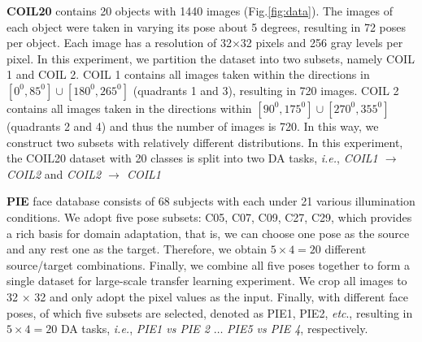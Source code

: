 \documentclass[journal,twocolumn]{IEEEtran}
\begin{document}
\begin{CJK*}{UTF8}{gkai}
\textbf{COIL20} contains 20 objects with 1440 images (Fig.\ref{fig:data}). The images of each object were taken in varying its pose about 5 degrees, resulting in 72 poses per object. Each image has a resolution of 32×32 pixels and 256 gray levels per pixel. In this experiment, we partition the dataset into two subsets, namely COIL 1 and COIL 2\cite{DBLP:journals/tip/XuFWLZ16}. COIL 1 contains all images taken within the directions in $[{0^0},{85^0}] \cup [{180^0},{265^0}]$ (quadrants 1 and 3), resulting in 720 images. COIL 2 contains all images taken in the directions
within $[{90^0},{175^0}] \cup [{270^0},{355^0}]$ (quadrants 2 and 4) and thus the number of images is 720. In this way, we construct two subsets with relatively different distributions. In this experiment, the COIL20 dataset with 20 classes is split into two DA tasks, \textit{i.e.},  \emph{ COIL1 $\rightarrow$ COIL2} and \emph{COIL2 $\rightarrow$ COIL1}



\textbf{PIE} face database consists of 68 subjects with each under 21 various illumination conditions\cite{DBLP:journals/tip/DingF17,long2013transfer}. We adopt five pose subsets: C05, C07, C09, C27, C29, which provides a rich basis for domain adaptation, that is, we can choose one pose as the source and any rest one as the target. Therefore, we obtain $5 \times 4=20$ different source/target combinations. Finally, we combine all five poses together to form a single dataset for large-scale transfer learning experiment. We crop all images to 32 × 32 and only adopt the pixel values as the input. Finally, with different face {poses}, of which five subsets are selected, denoted as PIE1, PIE2, \textit{etc}., resulting in $5 \times 4=20$ DA tasks, \textit{i.e.}, \emph{PIE1 vs PIE 2} $\dots$ \emph{PIE5 vs PIE 4}, respectively.



\end{CJK*}
\end{document}
